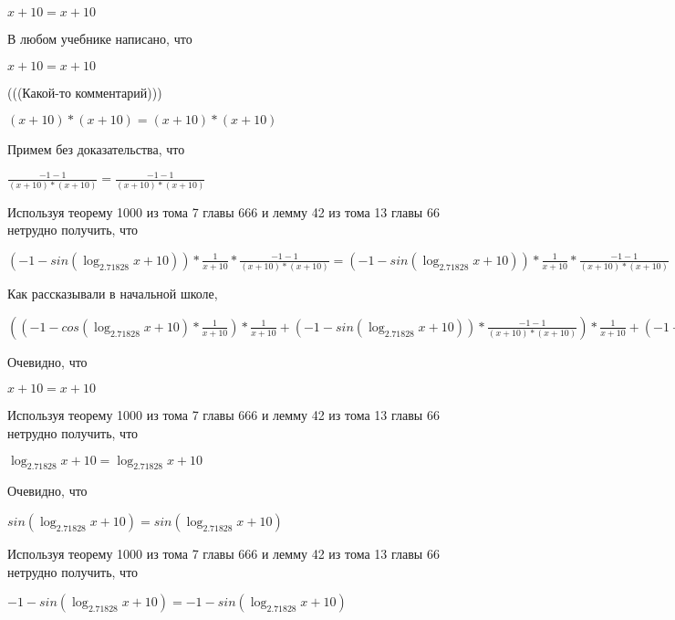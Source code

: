 \documentclass[12pt,a4paper,fleqn]{article}
\theoremstyle{definition}
\begin{document}
$ x  +  10  =  x  +  10 $

В любом учебнике написано, что 

$ x  +  10  =  x  +  10 $

(((Какой-то комментарий))) 

$( x  +  10 ) * ( x  +  10 ) = ( x  +  10 ) * ( x  +  10 )$

Примем без доказательства, что 

$\frac{ -1  -  1 }{( x  +  10 ) * ( x  +  10 )}
 = \frac{ -1  -  1 }{( x  +  10 ) * ( x  +  10 )}
$

Используя теорему 1000 из тома 7 главы 666 и лемму 42 из тома 13 главы 66 нетрудно получить, что 

$( -1  - sin(\log_{ 2.71828 }{ x  +  10 })) * \frac{ 1 }{ x  +  10 }
 * \frac{ -1  -  1 }{( x  +  10 ) * ( x  +  10 )}
 = ( -1  - sin(\log_{ 2.71828 }{ x  +  10 })) * \frac{ 1 }{ x  +  10 }
 * \frac{ -1  -  1 }{( x  +  10 ) * ( x  +  10 )}
$

Как рассказывали в начальной школе, 

$(( -1  - cos(\log_{ 2.71828 }{ x  +  10 }) * \frac{ 1 }{ x  +  10 }
) * \frac{ 1 }{ x  +  10 }
 + ( -1  - sin(\log_{ 2.71828 }{ x  +  10 })) * \frac{ -1  -  1 }{( x  +  10 ) * ( x  +  10 )}
) * \frac{ 1 }{ x  +  10 }
 + ( -1  - sin(\log_{ 2.71828 }{ x  +  10 })) * \frac{ 1 }{ x  +  10 }
 * \frac{ -1  -  1 }{( x  +  10 ) * ( x  +  10 )}
 = (( -1  - cos(\log_{ 2.71828 }{ x  +  10 }) * \frac{ 1 }{ x  +  10 }
) * \frac{ 1 }{ x  +  10 }
 + ( -1  - sin(\log_{ 2.71828 }{ x  +  10 })) * \frac{ -1  -  1 }{( x  +  10 ) * ( x  +  10 )}
) * \frac{ 1 }{ x  +  10 }
 + ( -1  - sin(\log_{ 2.71828 }{ x  +  10 })) * \frac{ 1 }{ x  +  10 }
 * \frac{ -1  -  1 }{( x  +  10 ) * ( x  +  10 )}
$

Очевидно, что 

$ x  +  10  =  x  +  10 $

Используя теорему 1000 из тома 7 главы 666 и лемму 42 из тома 13 главы 66 нетрудно получить, что 

$\log_{ 2.71828 }{ x  +  10 } = \log_{ 2.71828 }{ x  +  10 }$

Очевидно, что 

$sin(\log_{ 2.71828 }{ x  +  10 }) = sin(\log_{ 2.71828 }{ x  +  10 })$

Используя теорему 1000 из тома 7 главы 666 и лемму 42 из тома 13 главы 66 нетрудно получить, что 

$ -1  - sin(\log_{ 2.71828 }{ x  +  10 }) =  -1  - sin(\log_{ 2.71828 }{ x  +  10 })$
\end{document}
